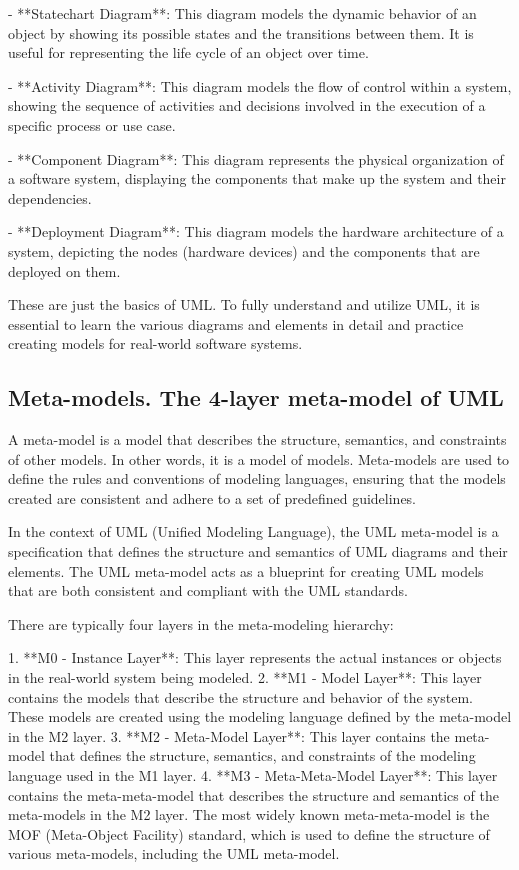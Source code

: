 \documentclass{article}
\begin{document}
- **Statechart Diagram**: This diagram models the dynamic behavior of an object by showing its possible states and the transitions between them. It is useful for representing the life cycle of an object over time.

- **Activity Diagram**: This diagram models the flow of control within a system, showing the sequence of activities and decisions involved in the execution of a specific process or use case.

- **Component Diagram**: This diagram represents the physical organization of a software system, displaying the components that make up the system and their dependencies.

- **Deployment Diagram**: This diagram models the hardware architecture of a system, depicting the nodes (hardware devices) and the components that are deployed on them.

These are just the basics of UML. To fully understand and utilize UML, it is essential to learn the various diagrams and elements in detail and practice creating models for real-world software systems.


\subsection{Meta-models. The 4-layer meta-model of UML}

A meta-model is a model that describes the structure, semantics, and constraints of other models. In other words, it is a model of models. Meta-models are used to define the rules and conventions of modeling languages, ensuring that the models created are consistent and adhere to a set of predefined guidelines.

In the context of UML (Unified Modeling Language), the UML meta-model is a specification that defines the structure and semantics of UML diagrams and their elements. The UML meta-model acts as a blueprint for creating UML models that are both consistent and compliant with the UML standards.

There are typically four layers in the meta-modeling hierarchy:

1. **M0 - Instance Layer**: This layer represents the actual instances or objects in the real-world system being modeled.
2. **M1 - Model Layer**: This layer contains the models that describe the structure and behavior of the system. These models are created using the modeling language defined by the meta-model in the M2 layer.
3. **M2 - Meta-Model Layer**: This layer contains the meta-model that defines the structure, semantics, and constraints of the modeling language used in the M1 layer.
4. **M3 - Meta-Meta-Model Layer**: This layer contains the meta-meta-model that describes the structure and semantics of the meta-models in the M2 layer. The most widely known meta-meta-model is the MOF (Meta-Object Facility) standard, which is used to define the structure of various meta-models, including the UML meta-model.
\end{document}
